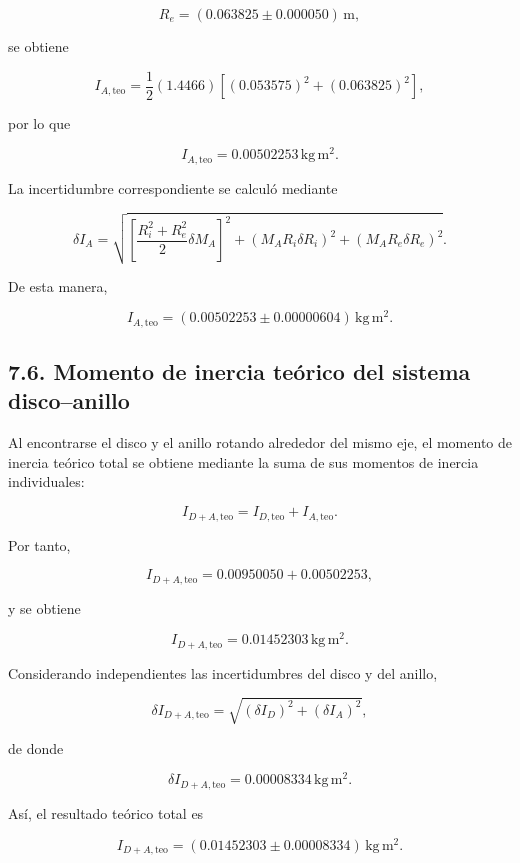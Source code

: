\documentclass[11pt,a4paper]{article}
\begin{document}
\[
R_e=(0.063825\pm0.000050)\,\mathrm{m},
\]

se obtiene

\[
I_{A,\mathrm{teo}}
=
\frac{1}{2}(1.4466)
\left[
(0.053575)^2+(0.063825)^2
\right],
\]

por lo que

\[
I_{A,\mathrm{teo}}
=
0.00502253\,\mathrm{kg\,m^2}.
\]

La incertidumbre correspondiente se calculó mediante

\[
\delta I_A=
\sqrt{
\left[
\frac{R_i^2+R_e^2}{2}\delta M_A
\right]^2
+
\left(
M_A R_i\delta R_i
\right)^2
+
\left(
M_A R_e\delta R_e
\right)^2
}.
\]

De esta manera,

\begin{equation}
I_{A,\mathrm{teo}}
=
(0.00502253\pm0.00000604)\,\mathrm{kg\,m^2}.
\label{eq:I_anillo_teorico_final}
\end{equation}



\subsection*{7.6. Momento de inercia teórico del sistema disco--anillo}

Al encontrarse el disco y el anillo rotando alrededor del mismo eje, el
momento de inercia teórico total se obtiene mediante la suma de sus
momentos de inercia individuales:

\[
I_{D+A,\mathrm{teo}}
=
I_{D,\mathrm{teo}}
+
I_{A,\mathrm{teo}}.
\]

Por tanto,

\[
I_{D+A,\mathrm{teo}}
=
0.00950050
+
0.00502253,
\]

y se obtiene

\[
I_{D+A,\mathrm{teo}}
=
0.01452303\,\mathrm{kg\,m^2}.
\]

Considerando independientes las incertidumbres del disco y del anillo,

\[
\delta I_{D+A,\mathrm{teo}}
=
\sqrt{
(\delta I_D)^2+
(\delta I_A)^2
},
\]

de donde

\[
\delta I_{D+A,\mathrm{teo}}
=
0.00008334\,\mathrm{kg\,m^2}.
\]

Así, el resultado teórico total es

\begin{equation}
I_{D+A,\mathrm{teo}}
=
(0.01452303\pm0.00008334)\,\mathrm{kg\,m^2}.
\label{eq:I_teorico_total}
\end{equation}
\end{document}
